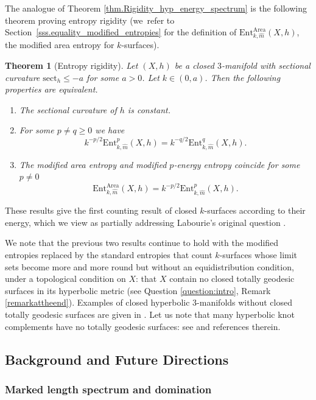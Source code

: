 \documentclass[11pt]{article}
\newcommand{\Subsection}{\subsection}
\newcommand{\ksurfaces}{$k$\nobreakdash-surfaces\xspace}
\theoremstyle{plain}
\newtheorem{theorem}{Theorem}[section]
\theoremstyle{definition}
\newcommand{\sect}{\mathrm{sect}}
\newcommand{\Ent}{\mathrm{Ent}}
\begin{document}
The analogue of Theorem \ref{thm.Rigidity_hyp_energy_spectrum} is the following theorem proving entropy rigidity (we~refer to Section~\ref{sss.equality_modified_entropies} for the definition of $\Ent^\mathrm{Area}_{k,\hat m}(X,h)$, the modified area entropy for \ksurfaces).

\begin{theorem}[Entropy rigidity]\label{equality_energy_area}
Let $(X,h)$ be a closed $3$\nobreakdash-manifold with sectional curvature $\sect_h\leq -a$ for some $a>0$. Let $k\in (0,a)$. Then the following properties are equivalent.
\begin{enumerate}
\item The sectional curvature of $h$ is constant.
\item For some $p\neq q\geq 0$ we have
\[
k^{-p/2} \Ent^p_{k,\hat m}(X,h)=k^{-q/2}\Ent^q_{k,\hat m}(X,h).
\]

\item The modified area entropy and modified $p$-energy entropy coincide for some $p\neq 0$
\[
\Ent^\mathrm{Area}_{k,\hat m}(X,h)=k^{-p/2}\Ent^p_{k,\hat m}(X,h).
\]
\end{enumerate}
\end{theorem}

These results give the first counting result of closed \ksurfaces according to their energy, which we view as partially addressing Labourie's original question \cite[Quest.\,(ii) p.\,243]{LabourieInvent}.

We note that the previous two results continue to hold with the modified entropies replaced by the standard entropies that count \ksurfaces whose limit sets become more and more round but without an equidistribution condition, under a topological condition on $X$: that $X$ contain no closed totally geodesic surfaces in its hyperbolic metric (see Question \ref{question:intro}, Remark \ref{remarkattheend}). Examples of closed hyperbolic 3-manifolds without closed totally geodesic surfaces are given in \cite{MR03}. Let us note that many hyperbolic knot complements have no totally geodesic surfaces: see \cite{Basilio_Lee_Malionek,Reid} and references therein.

\Subsection{Background and Future Directions}

\subsubsection{Marked length spectrum and domination}
\end{document}
